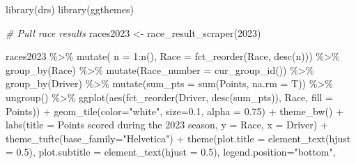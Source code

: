 \documentclass[
]{book}
\newenvironment{Shaded}{\begin{snugshade}}{\end{snugshade}}
\newcommand{\AttributeTok}[1]{\textcolor[rgb]{0.77,0.63,0.00}{#1}}
\newcommand{\CommentTok}[1]{\textcolor[rgb]{0.56,0.35,0.01}{\textit{#1}}}
\newcommand{\DecValTok}[1]{\textcolor[rgb]{0.00,0.00,0.81}{#1}}
\newcommand{\FloatTok}[1]{\textcolor[rgb]{0.00,0.00,0.81}{#1}}
\newcommand{\FunctionTok}[1]{\textcolor[rgb]{0.00,0.00,0.00}{#1}}
\newcommand{\NormalTok}[1]{#1}
\newcommand{\OtherTok}[1]{\textcolor[rgb]{0.56,0.35,0.01}{#1}}
\newcommand{\SpecialCharTok}[1]{\textcolor[rgb]{0.00,0.00,0.00}{#1}}
\newcommand{\StringTok}[1]{\textcolor[rgb]{0.31,0.60,0.02}{#1}}
\begin{document}
\begin{Shaded}
\begin{Highlighting}[]
\FunctionTok{library}\NormalTok{(drs)}
\FunctionTok{library}\NormalTok{(ggthemes)}

\CommentTok{\# Pull race results}
\NormalTok{races2023 }\OtherTok{\textless{}{-}} \FunctionTok{race\_result\_scraper}\NormalTok{(}\DecValTok{2023}\NormalTok{)}

\NormalTok{races2023 }\SpecialCharTok{\%\textgreater{}\%}
  \FunctionTok{mutate}\NormalTok{( }\AttributeTok{n =} \DecValTok{1}\SpecialCharTok{:}\FunctionTok{n}\NormalTok{(),}
          \AttributeTok{Race =} \FunctionTok{fct\_reorder}\NormalTok{(Race, }\FunctionTok{desc}\NormalTok{(n))) }\SpecialCharTok{\%\textgreater{}\%}
  \FunctionTok{group\_by}\NormalTok{(Race) }\SpecialCharTok{\%\textgreater{}\%} 
  \FunctionTok{mutate}\NormalTok{(}\AttributeTok{Race\_number =} \FunctionTok{cur\_group\_id}\NormalTok{()) }\SpecialCharTok{\%\textgreater{}\%}
  \FunctionTok{group\_by}\NormalTok{(Driver) }\SpecialCharTok{\%\textgreater{}\%} 
  \FunctionTok{mutate}\NormalTok{(}\AttributeTok{sum\_pts =} \FunctionTok{sum}\NormalTok{(Points, }\AttributeTok{na.rm =}\NormalTok{ T)) }\SpecialCharTok{\%\textgreater{}\%}
  \FunctionTok{ungroup}\NormalTok{() }\SpecialCharTok{\%\textgreater{}\%} 
  \FunctionTok{ggplot}\NormalTok{(}\FunctionTok{aes}\NormalTok{(}\FunctionTok{fct\_reorder}\NormalTok{(Driver, }\FunctionTok{desc}\NormalTok{(sum\_pts)), Race, }\AttributeTok{fill =}\NormalTok{ Points)) }\SpecialCharTok{+}
  \FunctionTok{geom\_tile}\NormalTok{(}\AttributeTok{color=}\StringTok{"white"}\NormalTok{, }\AttributeTok{size=}\FloatTok{0.1}\NormalTok{, }\AttributeTok{alpha =} \FloatTok{0.75}\NormalTok{) }\SpecialCharTok{+}
  \FunctionTok{theme\_bw}\NormalTok{() }\SpecialCharTok{+}
  \FunctionTok{labs}\NormalTok{(}\AttributeTok{title =} \StringTok{\textquotesingle{}Points scored during the 2023 season\textquotesingle{}}\NormalTok{,}
       \AttributeTok{y =} \StringTok{\textquotesingle{}Race\textquotesingle{}}\NormalTok{,}
       \AttributeTok{x =} \StringTok{\textquotesingle{}Driver\textquotesingle{}}\NormalTok{) }\SpecialCharTok{+} 
  \FunctionTok{theme\_tufte}\NormalTok{(}\AttributeTok{base\_family=}\StringTok{"Helvetica"}\NormalTok{)  }\SpecialCharTok{+}
  \FunctionTok{theme}\NormalTok{(}\AttributeTok{plot.title =} \FunctionTok{element\_text}\NormalTok{(}\AttributeTok{hjust =} \FloatTok{0.5}\NormalTok{),}
        \AttributeTok{plot.subtitle =} \FunctionTok{element\_text}\NormalTok{(}\AttributeTok{hjust =} \FloatTok{0.5}\NormalTok{),}
        \AttributeTok{legend.position=}\StringTok{"bottom"}\NormalTok{,}

\end{Highlighting}
\end{Shaded}
\end{document}
